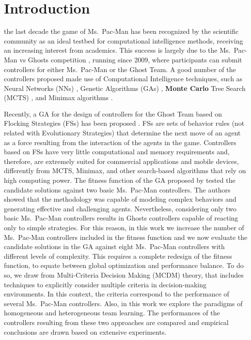 \documentclass[journal]{IEEEtran}
\begin{document}
\section{Introduction}
\label{sec:Introduction}

 the last decade the game of Ms.\  Pac-Man has been recognized by the scientific community as an ideal testbed for computational intelligence methods, receiving an increasing interest from academics. This success is largely due to the Ms.\  Pac-Man vs Ghosts competition \cite{Lucas2009,MsPacManVSGhost2011}, running since 2009, where participants can submit controllers for either Ms.\  Pac-Man or the Ghost Team. A good number of the controllers proposed made use of Computational Intelligence techniques, such as Neural Networks (NNs) \cite{Rojas1996}, Genetic Algorithms (GAs) \cite{Goldberg1988}, \textbf{Monte Carlo} Tree Search (MCTS) \cite{Browne2012}, and Minimax algorithms \cite{Osborne1994}.

Recently, a GA for the design of controllers for the Ghost Team based on Flocking Strategies (FSs) has been proposed \cite{Liberatore2014}. FSs are sets of behavior rules (not related with Evolutionary Strategies) that determine the next move of an agent as a force resulting from the interaction of the agents in the game. Controllers based on FSs have very little computational and memory requirements and, therefore, are extremely suited for commercial applications and mobile devices, differently from MCTS, Minimax, and other search-based algorithms that rely on high computing power. The fitness function of the GA proposed by \cite{Liberatore2014} tested the candidate solutions against two basic Ms.\  Pac-Man controllers. The authors showed that the methodology was capable of modeling complex behaviors and generating effective and challenging agents. Nevertheless, considering only two basic Ms.\  Pac-Man controllers results in Ghosts controllers capable of reacting only to simple strategies. For this reason, in this work we increase the number of Ms.\  Pac-Man controllers included in the fitness function and we now evaluate the candidate solutions in the GA against eight Ms.\  Pac-Man controllers with different levels of complexity. This requires a complete redesign of the fitness function, to equate between global optimization and performance balance. To do so, we draw from Multi-Criteria Decision Making (MCDM) theory, that includes techniques to explicitly consider multiple criteria in decision-making environments. In this context, the criteria correspond to the performance of several Ms.\  Pac-Man controllers.  Also, in this work we explore the paradigms of homogeneous and heterogeneous team learning. The performances of the controllers resulting from these two approaches are compared and empirical conclusions are drawn based on extensive experiments. 
\end{document}
